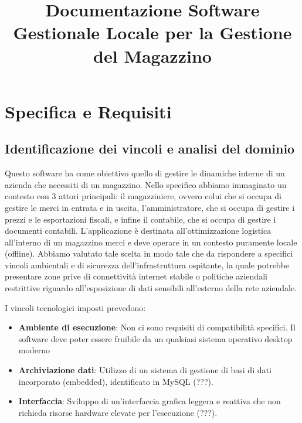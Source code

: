 \documentclass[a4paper,12pt]{article}
\title{Documentazione Software \\ \large Gestionale Locale per la Gestione del Magazzino}
\author{}
\date{}
\begin{document}
	
	\maketitle
	
	\section{Specifica e Requisiti}
	
	\subsection{Identificazione dei vincoli e analisi del dominio}
	Questo software ha come obiettivo quello di gestire le dinamiche interne di un azienda che necessiti di un magazzino. Nello specifico abbiamo immaginato un contesto con 3 attori principali:
	il magazziniere, ovvero colui che si occupa di gestire le merci in entrata e in uscita, l'amministratore, che si occupa di gestire i prezzi e le esportazioni fiscali, e infine il contabile, 
	che si occupa di gestire i documenti contabili. L'applicazione è destinata all'ottimizzazione logistica all'interno di un magazzino merci e deve operare in un contesto puramente locale (offline).
	Abbiamo valutato tale scelta in modo tale che 	da rispondere a specifici vincoli ambientali e di sicurezza dell'infrastruttura ospitante, la quale potrebbe presentare zone prive di connettività
	internet stabile o politiche aziendali restrittive riguardo all'esposizione di dati sensibili all'esterno della rete aziendale.
	
	I vincoli tecnologici imposti prevedono:
	\begin{itemize}
		\item \textbf{Ambiente di esecuzione}: Non ci sono requisiti di compatibilità specifici. Il software deve poter essere fruibile da un qualsiasi sistema operativo desktop moderno
		\item \textbf{Archiviazione dati}: Utilizzo di un sistema di gestione di basi di dati incorporato (embedded), identificato in MySQL (???).
		\item \textbf{Interfaccia}: Sviluppo di un'interfaccia grafica leggera e reattiva che non richieda risorse hardware elevate per l'esecuzione (???).
	\end{itemize}
	
\end{document}
